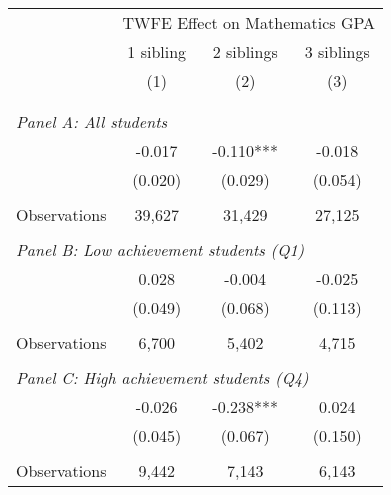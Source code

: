 \makeatletter
{}
{
\makeatother
\begin{tabular}{lccc}
\toprule
\cmidrule(lr){2-4}
& \multicolumn{3}{c}{TWFE Effect on Mathematics GPA} \\
\cmidrule(lr){2-4}
& 1 sibling & 2 siblings & 3 siblings  \\
\cmidrule(lr){2-2} \cmidrule(lr){3-3} \cmidrule(lr){4-4}
& (1) & (2) & (3)\\
\bottomrule
&  &  &  \\
&  &  &   \\
\multicolumn{4}{l}{\textit{Panel A: All students}} \\
\hspace{3mm}        &      -0.017   &      -0.110***&      -0.018   \\
                    &     (0.020)   &     (0.029)   &     (0.054)   \\
                    &               &               &               \\
\hspace{3mm}Observations&      39,627   &      31,429   &      27,125   \\
 
&  &  &   \\
\multicolumn{4}{l}{\textit{Panel B: Low achievement students (Q1)}} \\
\hspace{3mm}        &       0.028   &      -0.004   &      -0.025   \\
                    &     (0.049)   &     (0.068)   &     (0.113)   \\
                    &               &               &               \\
\hspace{3mm}Observations&       6,700   &       5,402   &       4,715   \\
 
&  &  &   \\
\multicolumn{4}{l}{\textit{Panel C: High achievement students (Q4)}} \\
\hspace{3mm}        &      -0.026   &      -0.238***&       0.024   \\
                    &     (0.045)   &     (0.067)   &     (0.150)   \\
                    &               &               &               \\
\hspace{3mm}Observations&       9,442   &       7,143   &       6,143   \\
 

\end{tabular}}
